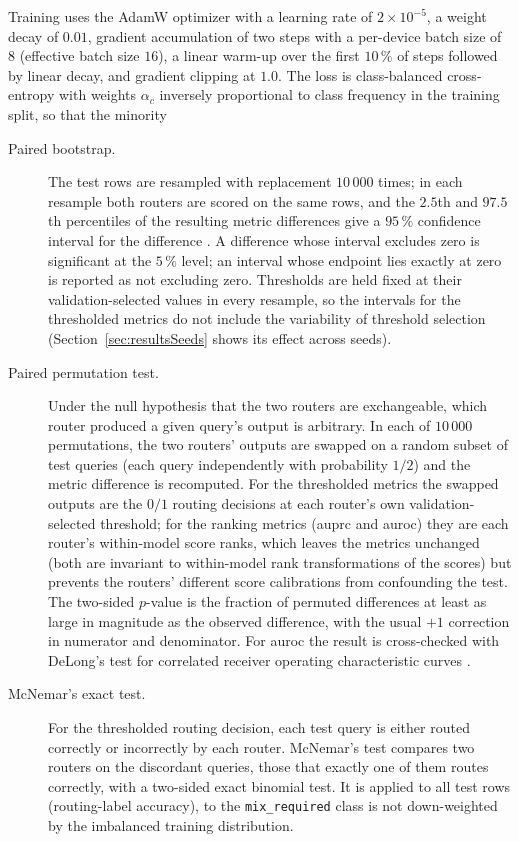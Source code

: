 \documentclass[english, bibtex]{kththesis}               %
\numberwithin{listing}{chapter}
\providecommand{\DIFaddtex}[1]{{\protect\color{blue} \sf #1}} %
\providecommand{\DIFdeltex}[1]{{\protect\color{red} \scriptsize #1}} %
\providecommand{\DIFaddbegin}{} %
\providecommand{\DIFaddend}{} %
\providecommand{\DIFdelbegin}{} %
\providecommand{\DIFdelend}{} %
\providecommand{\DIFadd}[1]{\texorpdfstring{\DIFaddtex{#1}}{#1}} %
\providecommand{\DIFdel}[1]{\texorpdfstring{\DIFdeltex{#1}}{}} %
\begin{document}
\DIFdel{Training uses the AdamW optimizer \cite{loshchilov2019decoupled} with a learning rate of $2 \times 10^{-5}$, a weight decay of $0.01$, gradient accumulation of two steps with a per-device batch size of $8$ (effective batch size $16$), a linear warm-up over the first $10\,\%$ of steps followed by linear decay, and gradient clipping at $1.0$. The loss is class-balanced cross-entropy with weights $\alpha_c$ inversely proportional to class frequency in the training split, so that the minority }\DIFdelend \DIFaddbegin \begin{description}
\item[\DIFadd{Paired bootstrap.}] \DIFadd{The test rows are resampled with replacement $10\,000$ times; in each resample both routers are scored on the same rows, and the $2.5$th and $97.5$th percentiles of the resulting metric differences give a $95\,\%$ confidence interval for the difference \cite{efron1979bootstrap}. A difference whose interval excludes zero is significant at the $5\,\%$ level; an interval whose endpoint lies exactly at zero is reported as not excluding zero. Thresholds are held fixed at their validation-selected values in every resample, so the intervals for the thresholded metrics do not include the variability of threshold selection (Section~\ref{sec:resultsSeeds} shows its effect across seeds).
}\item[\DIFadd{Paired permutation test.}] \DIFadd{Under the null hypothesis that the two routers are exchangeable, which router produced a given query's output is arbitrary. In each of $10\,000$ permutations, the two routers' outputs are swapped on a random subset of test queries (each query independently with probability $1/2$) and the metric difference is recomputed. For the thresholded metrics the swapped outputs are the $0/1$ routing decisions at each router's own validation-selected threshold; for the ranking metrics (\gls{auprc} and \gls{auroc}) they are each router's within-model score ranks, which leaves the metrics unchanged (both are invariant to within-model rank transformations of the scores) but prevents the routers' different score calibrations from confounding the test. The two-sided $p$-value is the fraction of permuted differences at least as large in magnitude as the observed difference, with the usual $+1$ correction in numerator and denominator. For \gls{auroc} the result is cross-checked with DeLong's test for correlated receiver operating characteristic curves \cite{delong1988}.
}\item[\DIFadd{McNemar's exact test.}] \DIFadd{For the thresholded routing decision, each test query is either routed correctly or incorrectly by each router. McNemar's test \cite{mcnemar1947} compares two routers on the discordant queries, those that exactly one of them routes correctly, with a two-sided exact binomial test. It is applied to all test rows (routing-label accuracy), to the }\DIFaddend \texttt{mix\_required} \DIFdelbegin \DIFdel{class is not down-weighted by the imbalanced training distribution.
}
\end{description}
\end{document}
